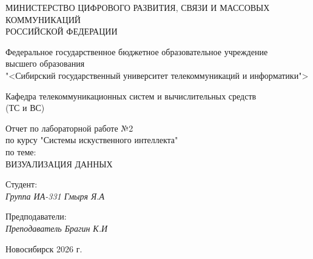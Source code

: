 \thispagestyle{empty}

\begin{center}
    МИНИСТЕРСТВО ЦИФРОВОГО РАЗВИТИЯ, СВЯЗИ И МАССОВЫХ КОММУНИКАЦИЙ \\ РОССИЙСКОЙ ФЕДЕРАЦИИ

    \vspace{20pt}

    Федеральное государственное бюджетное образовательное учреждение  \\  высшего образования \\
    "<Сибирский государственный университет телекоммуникаций и информатики"> \\

    \vspace{20pt}

    Кафедра телекоммуникационных систем и вычислительных средств \\  (ТС и ВС)
\end{center}

\vfill

\begin{center}
    Отчет по лабораторной работе №2 \\  
    по курсу "Системы искуственного интеллекта" \\
    \vspace{20pt}
    по теме: \\
    \uppercase{ВИЗУАЛИЗАЦИЯ ДАННЫХ}
\end{center}

\vfill

    \noindent Студент: \\
    \textit{Группа ИА-331 \hfill Гмыря Я.А} 

    \vspace{20pt}
 
    \noindent Предподаватели: \\
    \textit{Преподаватель \hfill Брагин К.И} \\
\vfill

\begin{center}
    Новосибирск 2026 г.
\end{center}
